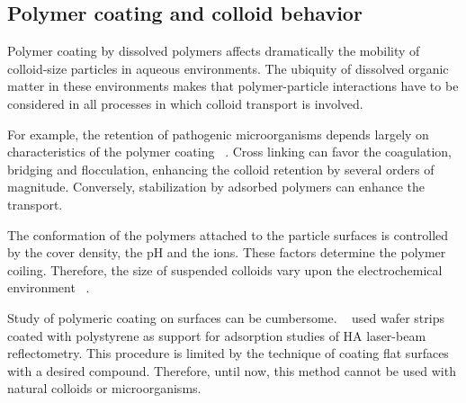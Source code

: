 \documentclass[journal=langd5,manuscript=article]{achemso}
\begin{document}
\subsection{Polymer coating and colloid behavior}

Polymer coating by dissolved polymers affects dramatically the mobility of colloid-size particles in aqueous environments. The ubiquity of dissolved organic matter  in these environments  makes that polymer-particle interactions have to be considered in all processes in which colloid transport is involved.

For example, the retention of pathogenic microorganisms depends largely on characteristics of the polymer coating~\cite{Morales2011a} . Cross linking can favor the coagulation, bridging and flocculation, enhancing the colloid retention by several orders of magnitude. Conversely,  stabilization by adsorbed polymers can enhance the transport.

The conformation of the polymers attached to the particle surfaces is controlled by the cover density, the pH and the ions. These factors determine the polymer coiling. Therefore, the size of suspended colloids vary upon the electrochemical environment~\cite{Morales2011a} .


Study of polymeric coating   on surfaces can be cumbersome. ~\citeauthor{doi:10.1021/es981236u}\cite{doi:10.1021/es981236u}
used   wafer strips coated with  polystyrene as support for
adsorption studies of HA laser-beam reflectometry. This procedure is
limited by the technique of coating flat surfaces with a desired compound. Therefore, until now, this method cannot be used with  natural colloids or microorganisms.



\end{document}
